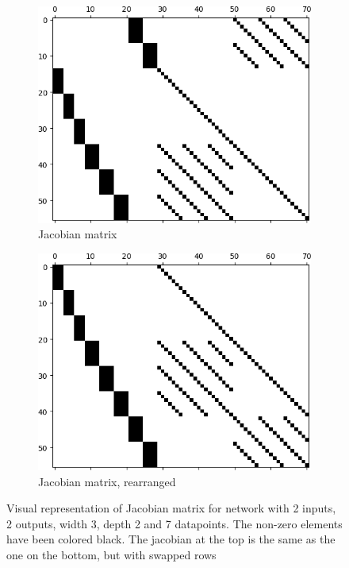 \begin{figure}[b]
	\centering
	\begin{subfigure}{\textwidth}
	  \centering
	  \includegraphics[width=\textwidth]{jac0.png}
	  \caption{Jacobian matrix}
	  \label{jac}
	\end{subfigure}
	\begin{subfigure}{\textwidth}
	  \centering
	  \includegraphics[width=\textwidth]{jac1.png}
	  \caption{Jacobian matrix, rearranged}
	  \label{jac2}
	\end{subfigure}
	\caption{Visual representation of Jacobian matrix for network with 2 inputs, 2 outputs, width 3, depth 2 and 7 datapoints. The non-zero elements have been colored black. The jacobian at the top is the same as the one on the bottom, but with swapped rows}
	\label{jactot}
\end{figure}

